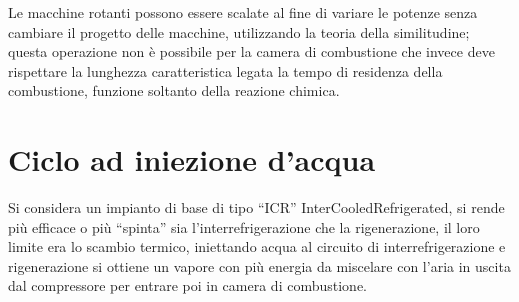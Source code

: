 Le macchine rotanti possono essere scalate al fine di variare le potenze senza
cambiare il progetto delle macchine, utilizzando la teoria della similitudine;
questa operazione non è possibile per la camera di combustione che invece deve
rispettare la lunghezza caratteristica legata la tempo di residenza della
combustione, funzione soltanto della reazione chimica.


\section{Ciclo ad iniezione d'acqua}
Si considera un impianto di base di tipo ``ICR'' InterCooledRefrigerated, si
rende più efficace o più ``spinta'' sia l'interrefrigerazione che la
rigenerazione, il loro limite era lo scambio termico, iniettando acqua al
circuito di interrefrigerazione e rigenerazione si ottiene un vapore con più
energia da miscelare con l'aria in uscita dal compressore per entrare poi in
camera di combustione.



